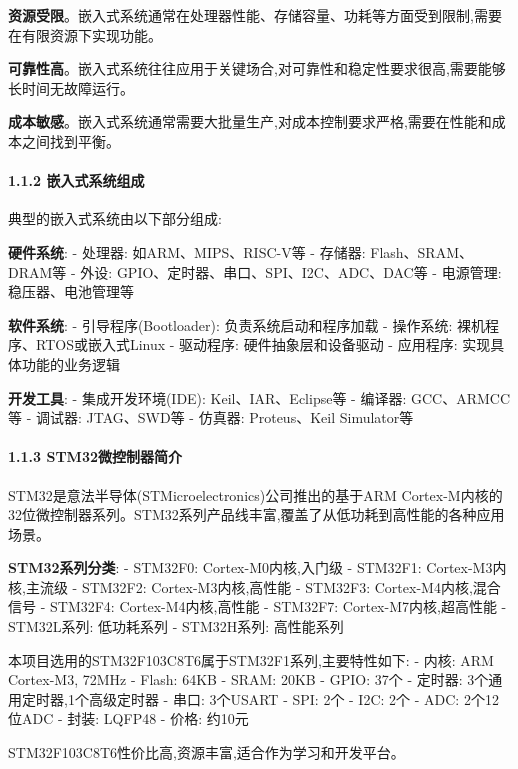 \documentclass[
]{article}
\begin{document}
\textbf{资源受限}。嵌入式系统通常在处理器性能、存储容量、功耗等方面受到限制,需要在有限资源下实现功能。

\textbf{可靠性高}。嵌入式系统往往应用于关键场合,对可靠性和稳定性要求很高,需要能够长时间无故障运行。

\textbf{成本敏感}。嵌入式系统通常需要大批量生产,对成本控制要求严格,需要在性能和成本之间找到平衡。

\hypertarget{ux5d4cux5165ux5f0fux7cfbux7edfux7ec4ux6210}{%
\paragraph{1.1.2
嵌入式系统组成}\label{ux5d4cux5165ux5f0fux7cfbux7edfux7ec4ux6210}}

典型的嵌入式系统由以下部分组成:

\textbf{硬件系统}: - 处理器: 如ARM、MIPS、RISC-V等 - 存储器:
Flash、SRAM、DRAM等 - 外设: GPIO、定时器、串口、SPI、I2C、ADC、DAC等 -
电源管理: 稳压器、电池管理等

\textbf{软件系统}: - 引导程序(Bootloader): 负责系统启动和程序加载 -
操作系统: 裸机程序、RTOS或嵌入式Linux - 驱动程序: 硬件抽象层和设备驱动 -
应用程序: 实现具体功能的业务逻辑

\textbf{开发工具}: - 集成开发环境(IDE): Keil、IAR、Eclipse等 - 编译器:
GCC、ARMCC等 - 调试器: JTAG、SWD等 - 仿真器: Proteus、Keil Simulator等

\hypertarget{stm32ux5faeux63a7ux5236ux5668ux7b80ux4ecb}{%
\paragraph{1.1.3
STM32微控制器简介}\label{stm32ux5faeux63a7ux5236ux5668ux7b80ux4ecb}}

STM32是意法半导体(STMicroelectronics)公司推出的基于ARM
Cortex-M内核的32位微控制器系列。STM32系列产品线丰富,覆盖了从低功耗到高性能的各种应用场景。

\textbf{STM32系列分类}: - STM32F0: Cortex-M0内核,入门级 - STM32F1:
Cortex-M3内核,主流级 - STM32F2: Cortex-M3内核,高性能 - STM32F3:
Cortex-M4内核,混合信号 - STM32F4: Cortex-M4内核,高性能 - STM32F7:
Cortex-M7内核,超高性能 - STM32L系列: 低功耗系列 - STM32H系列: 高性能系列

本项目选用的STM32F103C8T6属于STM32F1系列,主要特性如下: - 内核: ARM
Cortex-M3, 72MHz - Flash: 64KB - SRAM: 20KB - GPIO: 37个 - 定时器:
3个通用定时器,1个高级定时器 - 串口: 3个USART - SPI: 2个 - I2C: 2个 -
ADC: 2个12位ADC - 封装: LQFP48 - 价格: 约10元

STM32F103C8T6性价比高,资源丰富,适合作为学习和开发平台。
\end{document}
